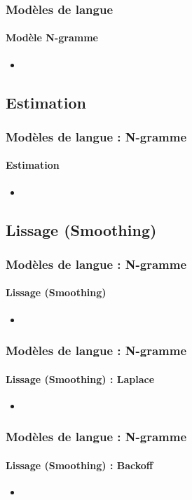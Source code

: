 \documentclass[xcolor=table]{beamer}
\begin{document}
\begin{frame}
\frametitle{Modèles de langue}
\framesubtitle{Modèle N-gramme}

\begin{itemize}
	\item 
\end{itemize}

\end{frame}

\subsection{Estimation}

\begin{frame}
\frametitle{Modèles de langue : N-gramme}
\framesubtitle{Estimation}

\begin{itemize}
	\item 
\end{itemize}

\end{frame}

\subsection{Lissage (Smoothing)}

\begin{frame}
\frametitle{Modèles de langue : N-gramme}
\framesubtitle{Lissage (Smoothing)}

\begin{itemize}
	\item 
\end{itemize}

\end{frame}

\begin{frame}
\frametitle{Modèles de langue : N-gramme}
\framesubtitle{Lissage (Smoothing) : Laplace}

\begin{itemize}
	\item 
\end{itemize}

\end{frame}

\begin{frame}
\frametitle{Modèles de langue : N-gramme}
\framesubtitle{Lissage (Smoothing) : Backoff}

\begin{itemize}
	\item 
\end{itemize}

\end{frame}
\end{document}
